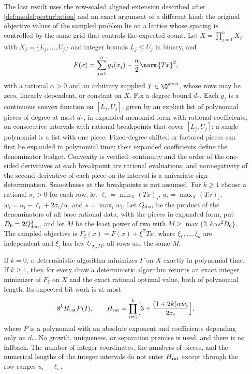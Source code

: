 The last result uses the row-scaled aligned extension described after
\cref{def:model:perturbation} and an exact
argument of a different kind: the original objective values of the sampled
problem lie on a lattice whose spacing is controlled by the same grid that
controls the expected count. Let $X=\prod_{j=1}^nX_j$ with
$X_j=\{L_j,\ldots,U_j\}$ and integer bounds $L_j\le U_j$ in binary, and
\begin{equation}\label{eq:int:lowrank-model}
 F(x)=\sum_{j=1}^ng_j(x_j)-\frac\alpha2\norm{Tx}^2,
\end{equation}
with a rational $\alpha>0$ and an arbitrary supplied $T\in\Q^{k\times n}$,
whose rows may be zero, linearly dependent, or constant on $X$. Fix a degree
bound $d_*$. Each $g_j$ is a continuous convex function on $[L_j,U_j]$, given
by an explicit list of polynomial pieces of degree at most $d_*$, in expanded
monomial form with rational coefficients, on consecutive intervals with
rational breakpoints that cover $[L_j,U_j]$; a single polynomial is a list with
one piece. Fixed-degree shifted or factored pieces can first be expanded in
polynomial time; their expanded coefficients define the denominator budget.
Convexity is verified: continuity and the order of the one-sided
derivatives at each breakpoint are rational evaluations, and nonnegativity of
the second derivative of each piece on its interval is a univariate sign
determination. Smoothness at the breakpoints is not assumed. For $k\ge1$
choose a rational $\sigma_i>0$ for each row, let $\ell_i=\min_X(Tx)_i$,
$u_i=\max_X(Tx)_i$, $w_i=u_i-\ell_i+2\sigma_i/\alpha$, and $s=\max_iw_i$. Let
$Q_{\rm den}$ be the product of the denominators of all base rational data,
with the pieces in expanded form, put $D_0=2Q_{\rm den}^3$, and let $M$ be the
least power of two with $M\ge\max\{2,k\alpha s^2D_0\}$. The sampled objective
is $F_\xi(x)=F(x)+\xi^{\mathsf T}Tx$, where $\xi_1,\ldots,\xi_k$ are
independent and $\xi_i$ has law $U_{\sigma_i,M}$; all rows use the same $M$.

\begin{theorem}\label{thm:int:lowrank}
If $k=0$, a deterministic algorithm minimizes $F$ on $X$ exactly in
polynomial time. If $k\ge1$, then for every draw a deterministic algorithm
returns an exact integer minimizer of $F_\xi$ on $X$ and the exact rational
optimal value, both of polynomial length. Its expected bit work is at most
\[
 8^kH_{\rm rat}P(I),\qquad
 H_{\rm rat}=\prod_{i=1}^k\Bigl[3+\frac{(1+2k)\alpha w_i}{2\sigma_i}\Bigr],
\]
where $P$ is a polynomial with an absolute exponent and coefficients
depending only on $d_*$. No growth, uniqueness, or separation premise is
used, and there is no fallback. The number of integer coordinates, the
numbers of pieces, and the numerical lengths of the integer intervals do not
enter $H_{\rm rat}$ except through the row ranges $u_i-\ell_i$.
\end{theorem}


